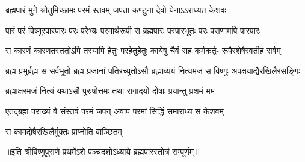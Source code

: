 \begingroup
{}

\addtocounter{shlokacount}{53}

\twolineshloka
{ब्रह्मपारं मुने श्रोतुमिच्छामः परमं स्तवम्}
{जपता कण्डुना देवो येनाऽऽराध्यत केशवः} %

\fourlineindentedshloka
{पारं परं विष्णुरपारपारः}
{परः परेभ्यः परमार्थरूपी}
{स ब्रह्मपारः परपारभूतः}
{परः पराणामपि पारपारः} %

\fourlineindentedshloka
{स कारणं कारणतस्ततोऽपि}
{तस्यापि हेतुः परहेतुहेतुः}
{कार्येषु चैवं सह कर्मकर्तृ-}
{रूपैरशेषैरवतीह सर्वम्} %

\fourlineindentedshloka
{ब्रह्म प्रभुर्ब्रह्म स सर्वभूतो}
{ब्रह्म प्रजानां पतिरच्युतोऽसौ} 
{ब्रह्माव्ययं नित्यमजं स विष्णुः}
{अपक्षयाद्यैरखिलैरसङ्गिः} %

\twolineshloka
{ब्रह्माक्षरमजं नित्यं यथाऽसौ पुरुषोत्तमः}
{तथा रागादयो दोषाः प्रयान्तु प्रशमं मम} %


\twolineshloka
{एतद्ब्रह्म पराख्यं वै संस्तवं परमं जपन्}
{अवाप परमां सिद्धिं समाराध्य स केशवम्} %

{स कामदोषैरखिलैर्मुक्तः प्राप्नोति वाञ्छितम्} %

॥इति श्रीविष्णुपुराणे प्रथमेंऽशे पञ्चदशोऽध्याये ब्रह्मपारस्तोत्रं सम्पूर्णम्॥ 

\endgroup